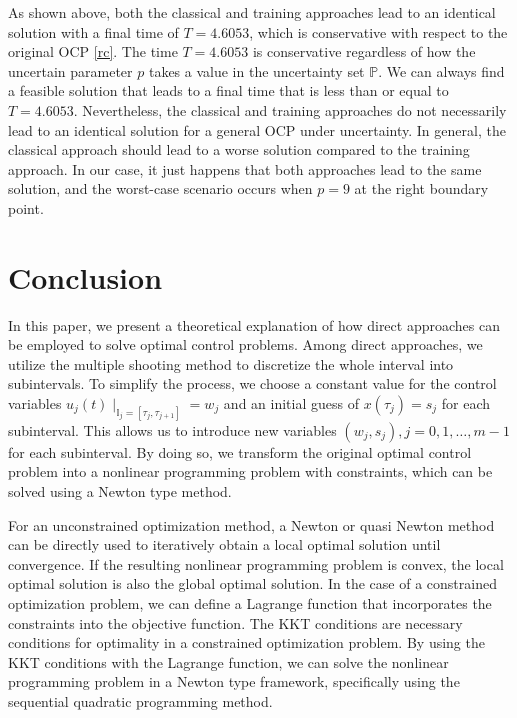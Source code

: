 \documentclass  [
  paper    = a4,
  BCOR     = 10mm,
  twoside,
  fontsize = 12pt,
  fleqn,
  toc      = bibnumbered,
  toc      = listofnumbered,
  numbers  = noendperiod,
  headings = normal,
  listof   = leveldown,
  version  = 3.03
]                                       {scrreprt}
\newcommand{\<}{\langle}
\renewcommand{\>}{\rangle}
\begin{document}
As shown above, both the classical and training approaches lead to an identical solution with a final time of $T=4.6053$, which is conservative with respect to the original OCP \ref{rc}. The time $T=4.6053$ is conservative regardless of how the uncertain parameter $p$ takes a value in the uncertainty set $\mathbb{P}$. We can always find a feasible solution that leads to a final time that is less than or equal to $T=4.6053$. Nevertheless, the classical and training approaches do not necessarily lead to an identical solution for a general OCP under uncertainty. In general, the classical approach should lead to a worse solution compared to the training approach. In our case, it just happens that both approaches lead to the same solution, and the worst-case scenario occurs when $p=9$ at the right boundary point.




\chapter{Conclusion}
\label{Chapter5}

In this paper, we present a theoretical explanation of how direct approaches can be employed to solve optimal control problems. Among direct approaches, we utilize the multiple shooting method to discretize the whole interval into subintervals. To simplify the process, we choose a constant value for the control variables $u_j(t)\mid_{\mathbb{I}_j = [\tau_j,\tau_{j+1}]} = w_j$ and an initial guess of $x(\tau_j)=s_j$ for each subinterval. This allows us to introduce new variables $(w_j, s_j), j=0,1,\dots,m-1$ for each subinterval. 
By doing so, we transform the original optimal control problem into a nonlinear programming problem with constraints, which can be solved using a Newton type method.

For an unconstrained optimization method, a Newton or quasi Newton method can be directly used to iteratively obtain a local optimal solution until convergence. If the resulting nonlinear programming problem is convex, the local optimal solution is also the global optimal solution. In the case of a constrained optimization problem, we can define a Lagrange function that incorporates the constraints into the objective function. The KKT conditions are necessary conditions for optimality in a constrained optimization problem. By using the KKT conditions with the Lagrange function, we can solve the nonlinear programming problem in a Newton type framework, specifically using the sequential quadratic programming method.
\end{document}
